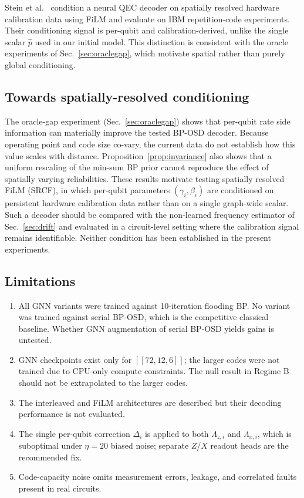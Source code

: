 \documentclass[a4paper,twocolumn,11pt,nopdfoutputerror]{quantumarticle}
\newcommand{\llr}{\Lambda}
\newcommand{\phat}{\hat{p}}
\newcommand{\code}[3]{\ensuremath{[\![#1,#2,#3]\!]}}
\begin{document}
Stein et al.~\cite{Stein2026FiLM} condition a neural QEC decoder on
spatially resolved hardware calibration data using FiLM and evaluate on
IBM repetition-code experiments. Their conditioning signal is per-qubit
and calibration-derived, unlike the single scalar $\phat$ used in our
initial model. This distinction is consistent with the oracle experiments
of Sec.~\ref{sec:oraclegap}, which motivate spatial rather than purely
global conditioning.
\subsection{Towards spatially-resolved conditioning}\label{sec:srcf}

The oracle-gap experiment (Sec.~\ref{sec:oraclegap}) shows that
per-qubit rate side information can materially improve the tested
BP-OSD decoder. Because operating point and code size co-vary, the
current data do not establish how this value scales with distance.
Proposition~\ref{prop:invariance} also shows that a uniform rescaling
of the min-sum BP prior cannot reproduce the effect of spatially varying
reliabilities. These results motivate testing spatially resolved FiLM
(SRCF), in which per-qubit parameters $(\gamma_i, \beta_i)$ are
conditioned on persistent hardware calibration data rather than on a
single graph-wide scalar. Such a decoder should be compared with the
non-learned frequency estimator of Sec.~\ref{sec:drift} and evaluated
in a circuit-level setting where the calibration signal remains
identifiable. Neither condition has been established in the present
experiments.

\subsection{Limitations}\label{sec:limitations}

\begin{enumerate}[leftmargin=*,topsep=3pt,itemsep=2pt,
                  label=(\roman*)]
\item All GNN variants were trained against 10-iteration
      flooding BP. No variant was trained against serial BP-OSD,
      which is the competitive classical baseline. Whether GNN
      augmentation of serial BP-OSD yields gains is untested.
\item GNN checkpoints exist only for $\code{72}{12}{6}$; the
      larger codes were not trained due to CPU-only compute
      constraints. The null result in Regime B should not be
      extrapolated to the larger codes.
\item The interleaved and FiLM architectures are described but their
      decoding performance is not evaluated.
\item The single per-qubit correction $\Delta_i$ is applied to
      both $\llr_{z,i}$ and $\llr_{x,i}$, which is suboptimal
      under $\eta = 20$ biased noise; separate $Z$/$X$ readout
      heads are the recommended fix.
\item Code-capacity noise omits measurement errors, leakage,
      and correlated faults present in real circuits.
\end{enumerate}
\end{document}
